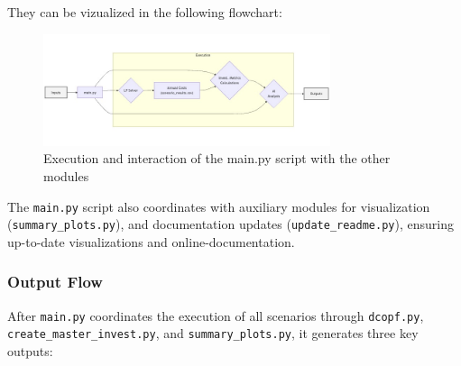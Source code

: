 They can be vizualized in the following flowchart:

\begin{figure}[H]
    \centering
    \includegraphics[width=0.75\textwidth]{images/execution-flow.jpeg}
    \caption{Execution and interaction of the main.py script with the other modules}
    \label{fig:execution-flow}
\end{figure}


      




The \texttt{main.py} script also coordinates with auxiliary modules for visualization (\texttt{summary\_plots.py}), 
and documentation updates (\texttt{update\_readme.py}), ensuring up-to-date visualizations and online-documentation.

\subsubsection{Output Flow}
\label{sec:output_flow}
After \texttt{main.py} coordinates the execution of all scenarios through \texttt{dcopf.py}, 
\texttt{create\_master\_invest.py}, and \texttt{summary\_plots.py}, it generates three key outputs:

